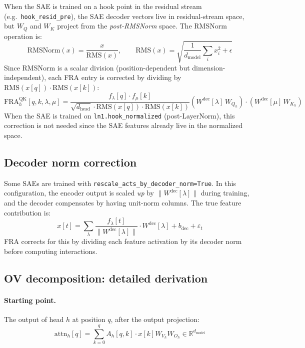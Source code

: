 \documentclass{article} %
\theoremstyle{plain}
\theoremstyle{definition}
\theoremstyle{remark}
\newcommand{\Wdec}{W^{\mathrm{dec}}}
\newcommand{\WQ}{W_Q}
\newcommand{\WK}{W_K}
\newcommand{\dmodel}{d_{\mathrm{model}}}
\newcommand{\dhead}{d_{\mathrm{head}}}
\newcommand{\flambda}{f_\lambda}
\newcommand{\fmu}{f_\mu}
\newcommand{\RR}{\mathbb{R}}
\begin{document}
When the SAE is trained on a hook point in the residual stream (e.g.\ \texttt{hook\_resid\_pre}), the SAE decoder vectors live in residual-stream space, but $\WQ$ and $\WK$ project from the \emph{post-RMSNorm} space. The RMSNorm operation is:
\begin{equation}
    \mathrm{RMSNorm}(x) = \frac{x}{\mathrm{RMS}(x)}, \qquad \mathrm{RMS}(x) = \sqrt{\frac{1}{\dmodel} \sum_i x_i^2 + \epsilon}
\end{equation}
Since RMSNorm is a scalar division (position-dependent but dimension-independent), each FRA entry is corrected by dividing by $\mathrm{RMS}(x[q]) \cdot \mathrm{RMS}(x[k])$:
\begin{equation}
    \mathrm{FRA}^{\mathrm{QK}}_h[q,k,\lambda,\mu] = \frac{\flambda[q] \cdot \fmu[k]}{\sqrt{\dhead} \cdot \mathrm{RMS}(x[q]) \cdot \mathrm{RMS}(x[k])} \left( \Wdec[\lambda]\,W_{Q_h} \right) \cdot \left( \Wdec[\mu]\,W_{K_h} \right)
\end{equation}
When the SAE is trained on \texttt{ln1.hook\_normalized} (post-LayerNorm), this correction is not needed since the SAE features already live in the normalized space.

\subsection{Decoder norm correction}
\label{app:dec_norm}

Some SAEs are trained with \texttt{rescale\_acts\_by\_decoder\_norm=True}. In this configuration, the encoder output is scaled \emph{up} by $\|\Wdec[\lambda]\|$ during training, and the decoder compensates by having unit-norm columns. The true feature contribution is:
\begin{equation}
    x[t] = \sum_\lambda \frac{\flambda[t]}{\|\Wdec[\lambda]\|} \cdot \Wdec[\lambda] + b_{\mathrm{dec}} + \varepsilon_t
\end{equation}
FRA corrects for this by dividing each feature activation by its decoder norm before computing interactions.

\subsection{OV decomposition: detailed derivation}
\label{app:ov_derivation}

\paragraph{Starting point.} The output of head $h$ at position $q$, after the output projection:
\begin{equation}
    \mathrm{attn}_h[q] = \sum_{k=0}^{q} A_h[q,k] \cdot x[k] W_{V_h} W_{O_h} \in \RR^{\dmodel}
\end{equation}
\end{document}

